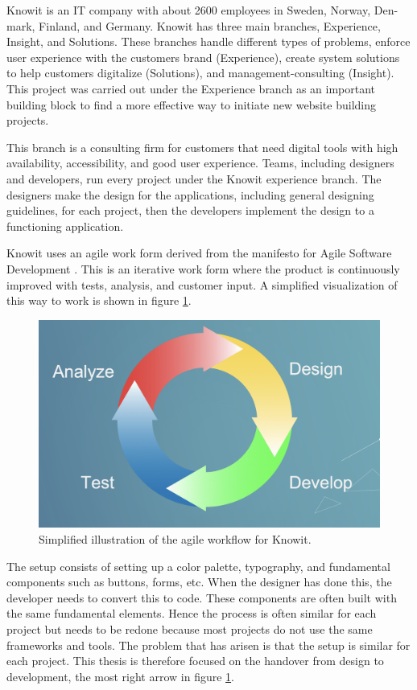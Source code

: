 Knowit is an IT company with about 2600 employees in Sweden, Norway, Den- mark, Finland, and Germany. Knowit has three main branches, Experience, Insight, and Solutions. These branches handle different types of problems, enforce user experience with the customers brand (Experience), create system solutions to help customers digitalize (Solutions), and management-consulting (Insight). This project was carried out under the Experience branch as an important building block to find a more effective way to initiate new website building projects. 

This branch is a consulting firm for customers that need digital tools with high availability, accessibility, and good user experience. Teams, including designers and developers, run every project under the Knowit experience branch. The designers make the design for the applications, including general designing guidelines, for each project, then the developers implement the design to a functioning application. 

Knowit uses an agile work form derived from the manifesto for Agile Software Development \cite{ManifestoAgileSoftware}. This is an iterative work form where the product is continuously improved with tests, analysis, and customer input. A simplified visualization of this way to work is shown in figure \ref{fig:agile}.

\begin{figure}[H]
  \centering
  \includegraphics[width=0.8\linewidth]{images/agile.png}
  \caption{Simplified illustration of the agile workflow for Knowit.}%
  \label{fig:agile}
\end{figure}

 The setup consists of setting up a color palette, typography, and fundamental \glspl{component} such as buttons, forms, etc. When the designer has done this, the developer needs to convert this to code. These components are often built with the same fundamental elements. Hence the process is often similar for each project but needs to be redone because most projects do not use the same frameworks and tools. The problem that has arisen is that the setup is similar for each project. This thesis is therefore focused on the handover from design to development, the most right arrow in figure \ref{fig:agile}.

